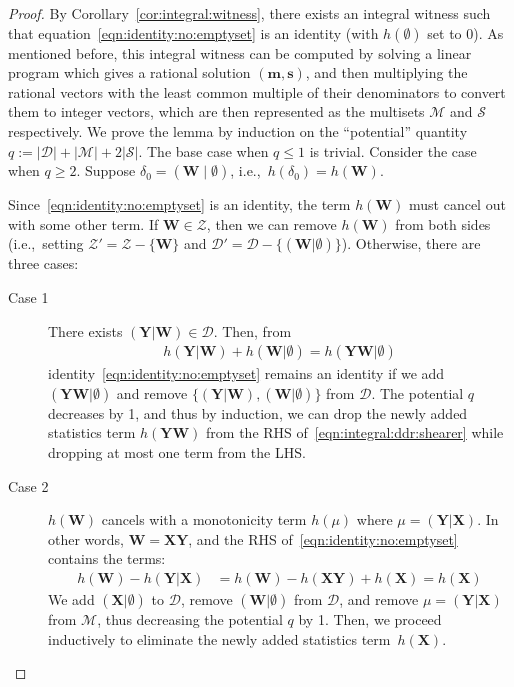 \documentclass[10pt,a4paper]{article}
\newcommand{\calM}{\mathcal M}
\newcommand{\calS}{\mathcal S}
\newcommand{\calD}{\mathcal D}
\newcommand{\calZ}{\mathcal Z}
\begin{document}
\begin{proof} By Corollary~\ref{cor:integral:witness}, there exists an integral witness such
that equation~\eqref{eqn:identity:no:emptyset} is an identity (with $h(\emptyset)$ set to $0$).
As mentioned before, this integral witness can be computed by solving a linear program
which gives a rational solution $(\bm m, \bm s)$, and then multiplying the rational vectors with the least common multiple of their denominators to convert them to integer vectors, which are then represented as the multisets $\calM$ and $\calS$ respectively.
We prove the lemma by induction on the ``potential'' quantity $q:=|\calD|+|\calM|+2|\calS|$.
The base case when $q \leq 1$ is trivial.
Consider the case when $q \geq 2$.
Suppose $\delta_0 = (\bm W \mid \emptyset)$, i.e.,~$h(\delta_0) = h(\bm W)$.

Since~\eqref{eqn:identity:no:emptyset} is an identity, the term $h(\bm W)$ must cancel out
with some other term. If $\bm W \in\calZ$, then we can remove $h(\bm W)$ from both sides
(i.e.,~setting $\calZ' = \calZ - \{\bm W\}$ and
$\calD' = \calD - \{(\bm W|\emptyset)\}$). Otherwise, there are three cases:

\begin{description}
  \item[Case 1]  There exists $(\bm Y|\bm W) \in \calD$.
    Then, from
    \begin{align}
      h(\bm Y|\bm W) + h(\bm W|\emptyset) = h(\bm Y\bm W|\emptyset)
      \label{eqn:D:step}
    \end{align}
    identity~\eqref{eqn:identity:no:emptyset} remains an identity if we
    add $(\bm Y\bm W|\emptyset)$ and remove
    $\{(\bm Y|\bm W), (\bm W|\emptyset)\}$ from $\calD$.
    The potential $q$ decreases by 1, and thus by induction,
    we can drop the newly added statistics term $h(\bm Y\bm W)$ from the RHS of~\eqref{eqn:integral:ddr:shearer} while dropping at most one term from the LHS.

  \item[Case 2] $h(\bm W)$ cancels with a monotonicity term $h(\mu)$ where
    $\mu = (\bm Y|\bm X)$.  In other words, $\bm W = \bm X\bm Y$, and
    the RHS of~\eqref{eqn:identity:no:emptyset} contains the terms:
    \begin{align}
        h(\bm W) - h(\bm Y|\bm X) &= h(\bm W) - h(\bm X\bm Y)+h(\bm X) =  h(\bm X)
        \label{eqn:M:step}
    \end{align}
    We add $(\bm X|\emptyset)$ to $\calD$, remove $(\bm W|\emptyset)$ from $\calD$, and remove
    $\mu = (\bm Y|\bm X)$ from $\calM$, thus decreasing the potential $q$ by 1.  Then, we proceed
    inductively to eliminate the newly added statistics term~$h(\bm X)$.


\end{description}
\end{proof}
\end{document}
